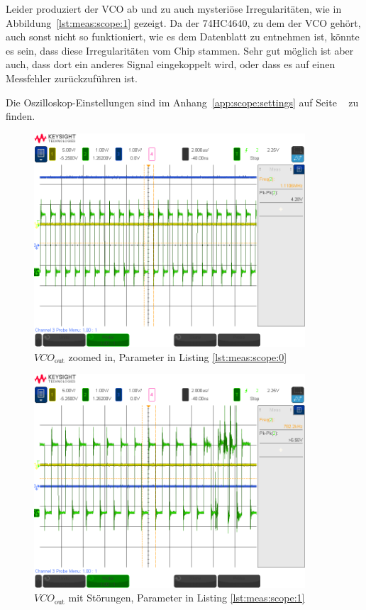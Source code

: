 Leider produziert der  VCO ab und zu auch  mysteri\"ose Irregularit\"aten, wie
in Abbildung~\ref{lst:meas:scope:1}  gezeigt. Da der 74HC4640, zu  dem der VCO
geh\"ort, auch sonst nicht so funktioniert, wie es dem Datenblatt zu entnehmen
ist, k\"onnte es sein, dass diese Irregularit\"aten vom Chip stammen. Sehr gut
m\"oglich ist aber auch, dass dort  ein anderes Signal eingekoppelt wird, oder
dass es auf einen Messfehler zur\"uckzuf\"uhren ist.

Die  Oszilloskop-Einstellungen  sind  im  Anhang~\ref{app:scope:settings}  auf
Seite ~\pageref{app:scope:settings} zu finden.

\vspace*{7em}
\begin{figure}[h!tb]
    \centering
    \includegraphics[width=0.9\textwidth, trim=0mm 21mm 0mm 11mm, clip]{images/scopeShots/scope_0b.png}
    \caption{$VCO_{\mathrm{out}}$ zoomed in, Parameter in Listing \ref{lst:meas:scope:0}}
    \label{fig:meas:scope:0}
\end{figure}

\begin{figure}[h!tb]
    \centering
    \includegraphics[width=0.9\textwidth, trim=0mm 21mm 0mm 11mm, clip]{images/scopeShots/scope_1b.png}
    \caption{$VCO_{\mathrm{out}}$ mit St\"orungen, Parameter in Listing \ref{lst:meas:scope:1}}
    \label{fig:meas:scope:1}
\end{figure}

